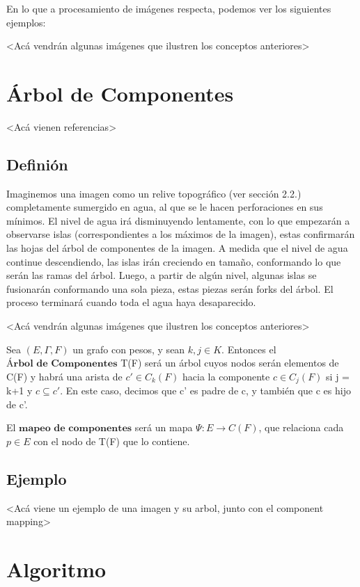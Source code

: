 En lo que a procesamiento de imágenes respecta, podemos ver los siguientes ejemplos:

<Acá vendrán algunas imágenes que ilustren los conceptos anteriores>

\section{Árbol de Componentes}

<Acá vienen referencias>

\subsection{Definión}

Imaginemos una imagen como un relive topográfico (ver sección 2.2.) completamente sumergido en agua, al que se le hacen perforaciones en sus mínimos. El nivel de agua irá disminuyendo lentamente, con lo que empezarán a observarse islas (correspondientes a los máximos de la imagen), estas confirmarán las hojas del árbol de componentes de la imagen. A medida que el nivel de agua continue descendiendo, las islas irán creciendo en tamaño, conformando lo que serán las ramas del árbol. Luego, a partir de algún nivel, algunas islas se fusionarán conformando una sola pieza, estas piezas serán forks del árbol. El proceso terminará cuando toda el agua haya desaparecido.

<Acá vendrán algunas imágenes que ilustren los conceptos anteriores>

Sea $(E,\Gamma,F)$ un grafo con pesos, y sean $k,j \in K$. Entonces el $\textbf{Árbol de Componentes}$ T(F) será un árbol cuyos nodos serán elementos de C(F) y habrá una arista de $c' \in C_k(F)$ hacia la componente $c \in C_j(F)$ si j = k+1 y $c \subseteq c'$. En este caso, decimos que c' es padre de c, y también que c es hijo de c'.

El $\textbf{mapeo de componentes}$ será un mapa $\Psi: E \to C(F)$, que relaciona cada $p \in E$ con el nodo de T(F) que lo contiene.

\subsection{Ejemplo}

<Acá viene un ejemplo de una imagen y su arbol, junto con el component mapping>

\section{Algoritmo}

